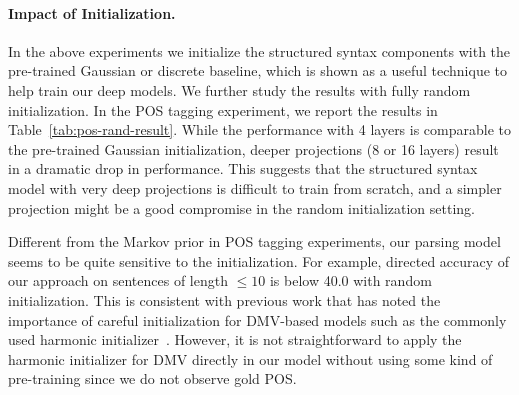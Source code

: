 \documentclass[11pt,a4paper]{article}
\begin{document}
\paragraph{Impact of Initialization. }
\begin{table}[!t]
    \centering
    \caption{Unsupervised POS tagging results of our approach on WSJ, with random initialization of syntax model.}
    \label{tab:pos-rand-result}
    \vspace{-5mm}
\end{table}
In the above experiments we initialize the structured syntax components with the pre-trained Gaussian or discrete baseline, which is shown as a useful technique to help train our deep models. We further study the results with fully random initialization. In the POS tagging experiment, we report the results in Table~\ref{tab:pos-rand-result}. While the performance with 4 layers is comparable to the pre-trained Gaussian initialization, deeper projections (8 or 16 layers) result in a dramatic drop in performance. This suggests that the structured syntax model with very deep projections is difficult to train from scratch, and a simpler projection might be a good compromise in the random initialization setting.   

Different from the Markov prior in POS tagging experiments, our parsing model seems to be quite sensitive to the initialization. For example, directed accuracy of our approach on sentences of length $\leqslant 10$ is below 40.0 with random initialization. This is consistent with previous work that has noted the importance of careful initialization for DMV-based models such as the commonly used harmonic initializer~\citep{klein2004corpus}. However, it is not straightforward to apply the harmonic initializer for DMV directly in our model without using some kind of pre-training since we do not observe gold POS.
\end{document}
